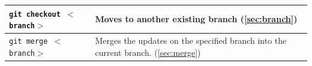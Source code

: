 \begin{table}[H]
\begin{tabular}{|m{7em}|m{23em}|}
        \texttt{git checkout $<$branch$>$} &
        Moves to another existing branch (\cref{sec:branch})
        \\ \hline
        
        \texttt{git merge $<$branch$>$} &
        Merges the updates on the specified branch into the current branch. (\cref{sec:merge})
        \\ \hline
        
        
        
        
    \end{tabular}
\end{table}
